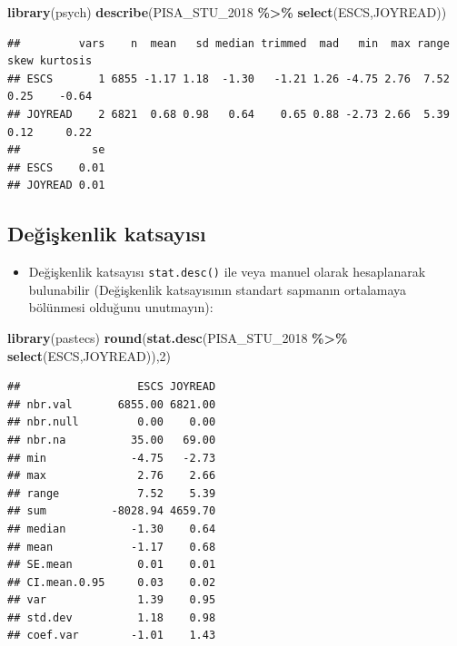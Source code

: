 \documentclass[
  oneside]{book}
\newenvironment{Shaded}{\begin{snugshade}}{\end{snugshade}}
\newcommand{\DecValTok}[1]{\textcolor[rgb]{0.00,0.00,0.81}{#1}}
\newcommand{\FunctionTok}[1]{\textcolor[rgb]{0.13,0.29,0.53}{\textbf{#1}}}
\newcommand{\NormalTok}[1]{#1}
\newcommand{\SpecialCharTok}[1]{\textcolor[rgb]{0.81,0.36,0.00}{\textbf{#1}}}
\providecommand{\tightlist}{%
  \setlength{\itemsep}{0pt}\setlength{\parskip}{0pt}}
\begin{document}
\begin{Shaded}
\begin{Highlighting}[]
\FunctionTok{library}\NormalTok{(psych)}
\FunctionTok{describe}\NormalTok{(PISA\_STU\_2018 }\SpecialCharTok{\%\textgreater{}\%} 
  \FunctionTok{select}\NormalTok{(ESCS,JOYREAD))}
\end{Highlighting}
\end{Shaded}

\begin{verbatim}
##         vars    n  mean   sd median trimmed  mad   min  max range skew kurtosis
## ESCS       1 6855 -1.17 1.18  -1.30   -1.21 1.26 -4.75 2.76  7.52 0.25    -0.64
## JOYREAD    2 6821  0.68 0.98   0.64    0.65 0.88 -2.73 2.66  5.39 0.12     0.22
##           se
## ESCS    0.01
## JOYREAD 0.01
\end{verbatim}

\hypertarget{deux11fiux15fkenlik-katsayux131sux131}{%
\subsection{Değişkenlik katsayısı}\label{deux11fiux15fkenlik-katsayux131sux131}}

\begin{itemize}
\tightlist
\item
  Değişkenlik katsayısı \texttt{stat.desc()} ile veya manuel olarak hesaplanarak bulunabilir (Değişkenlik katsayısının standart sapmanın ortalamaya bölünmesi olduğunu unutmayın):
\end{itemize}

\begin{Shaded}
\begin{Highlighting}[]
\FunctionTok{library}\NormalTok{(pastecs)}
\FunctionTok{round}\NormalTok{(}\FunctionTok{stat.desc}\NormalTok{(PISA\_STU\_2018 }\SpecialCharTok{\%\textgreater{}\%} 
  \FunctionTok{select}\NormalTok{(ESCS,JOYREAD)),}\DecValTok{2}\NormalTok{)}
\end{Highlighting}
\end{Shaded}

\begin{verbatim}
##                  ESCS JOYREAD
## nbr.val       6855.00 6821.00
## nbr.null         0.00    0.00
## nbr.na          35.00   69.00
## min             -4.75   -2.73
## max              2.76    2.66
## range            7.52    5.39
## sum          -8028.94 4659.70
## median          -1.30    0.64
## mean            -1.17    0.68
## SE.mean          0.01    0.01
## CI.mean.0.95     0.03    0.02
## var              1.39    0.95
## std.dev          1.18    0.98
## coef.var        -1.01    1.43
\end{verbatim}
\end{document}

